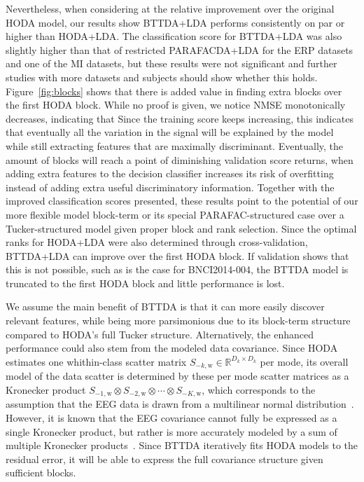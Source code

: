 Nevertheless, when considering at the relative improvement over the original
HODA model, our results show BTTDA+LDA performs consistently on par or higher than HODA+LDA.
The classification score for BTTDA+LDA was also slightly higher than that of
restricted PARAFACDA+LDA for the ERP datasets and one of the MI datasets, but these
results were not significant and further studies with more datasets and
subjects should show whether this holds.
Figure~\ref{fig:blocks} shows that there is added value in finding extra blocks
over the first HODA block.
While no proof is given, we notice NMSE monotonically decreases, indicating that
Since the training score keeps increasing, this indicates that
eventually all the variation in the signal will be explained by the model
while still extracting features that are maximally discriminant.
Eventually, the amount of blocks will reach a point of diminishing validation
score returns, when adding extra features to the decision classifier increases
its risk of overfitting instead of adding extra useful discriminatory
information.
Together with the improved classification scores presented, these results
point to the potential of our more flexible model block-term or
its special PARAFAC-structured case over a Tucker-structured model given proper block and
rank selection.
Since the optimal ranks for HODA+LDA were also determined through
cross-validation, BTTDA+LDA can improve over the first HODA block.
If validation shows that this is not possible, such as is the case for
BNCI2014-004, the BTTDA model is truncated to the first HODA block and little
performance is lost.

We assume the main benefit of BTTDA is that it can more easily discover relevant
features, while
being more parsimonious due to its block-term structure compared to HODA's full
Tucker structure.
Alternatively, the enhanced performance could also stem from the modeled data
covariance.
Since HODA estimates one whithin-class scatter matrix
$S_{-k,\text{w}}\in\mathbb{R}^{D_k\times D_k}$ per mode, its overall
model of the data scatter is determined by these per mode scatter matrices as a
Kronecker product $S_{-1,\text{w}}\otimes S_{-2,\text{w}}\otimes\cdots\otimes S_{-K,\text{w}}$, which corresponds to the assumption that the EEG data is
drawn from a multilinear normal distribution~\cite{Ohlson2013}.
However, it is known that the EEG covariance cannot fully be expressed as a
single Kronecker product, but rather is more accurately modeled by a sum of
multiple Kronecker products~\cite{Bijma2005, Sosulski2022}.
Since BTTDA iteratively fits HODA models to the residual error, it will be able
to express the full covariance structure given sufficient blocks.


